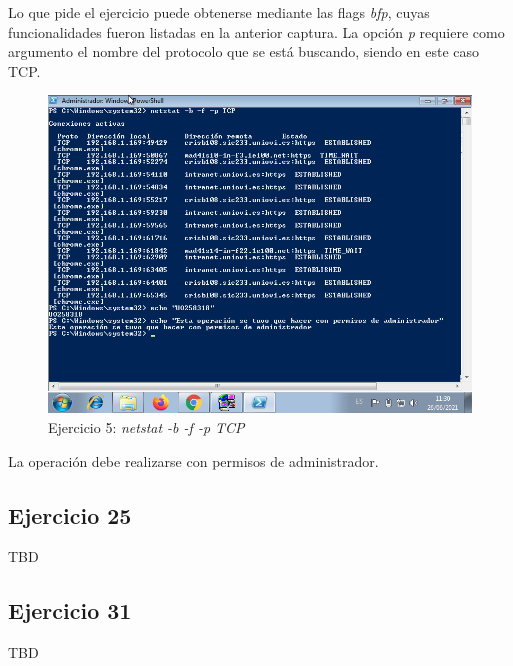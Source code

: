 \documentclass[11pt]{article}
\begin{document}
Lo que pide el ejercicio puede obtenerse mediante las flags \textit{bfp}, cuyas funcionalidades fueron listadas en la anterior captura. La opción \textit{p} requiere como argumento el nombre del protocolo que se está buscando, siendo en este caso TCP.

\begin{figure}[H]
    \caption{Ejercicio 5: \textit{netstat -b -f -p TCP}}
  \centering
    \includegraphics[scale=0.7]{p05/e5-7.png}
\end{figure}

La operación debe realizarse con permisos de administrador.

\subsection{Ejercicio 25}
TBD

\subsection{Ejercicio 31}
TBD
\end{document}

